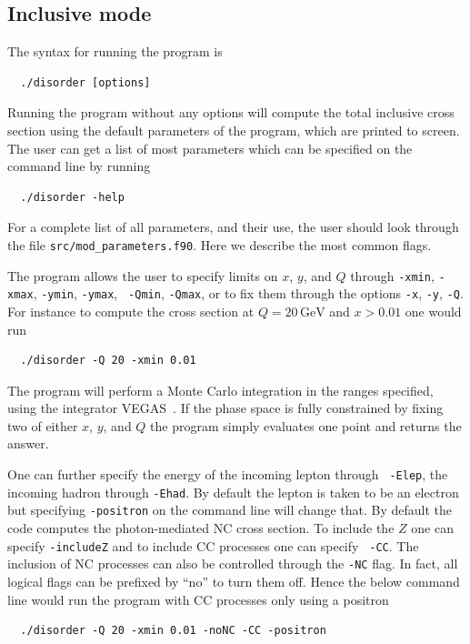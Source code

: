 \documentclass[submission, PhysCodeb]{SciPost}
\newcommand{\GEV}{\,\mathrm{GeV}}
\begin{document}
\subsection{Inclusive mode}
\label{sec:Inclusive}
The syntax for running the program is
\begin{lstlisting}
  ./disorder [options]
\end{lstlisting}
Running the program without any options will compute the total
inclusive cross section using the default parameters of the
program, which are printed to screen. The user can get a list of most
parameters which can be specified on the command line by running
\begin{lstlisting}
  ./disorder -help
\end{lstlisting}
For a complete list of all parameters, and their use, the user should
look through the file {\tt src/mod\_parameters.f90}. Here we describe
the most common flags.

The program allows the user to specify limits on $x$, $y$, and $Q$
through {\tt -xmin}, {\tt -xmax}, {\tt -ymin}, {\tt -ymax}, {\tt
  -Qmin}, {\tt -Qmax}, or to fix them through the options {\tt -x},
{\tt -y}, {\tt -Q}. For instance to compute the cross section at $Q=20
\GEV$ and $x>0.01$ one would run
\begin{lstlisting}
  ./disorder -Q 20 -xmin 0.01
\end{lstlisting}
The program will perform a Monte Carlo integration in the ranges
specified, using the integrator VEGAS~\cite{Lepage:1977sw}. If the
phase space is fully constrained by fixing two of either $x$, $y$, and
$Q$ the program simply evaluates one point and returns the answer.

One can further specify the energy of the incoming lepton through {\tt
  -Elep}, the incoming hadron through {\tt -Ehad}. By default the
lepton is taken to be an electron but specifying {\tt -positron} on
the command line will change that. By default the code computes the
photon-mediated NC cross section. To include the $Z$ one can specify
{\tt -includeZ} and to include CC processes one can specify {\tt
  -CC}. The inclusion of NC processes can also be controlled through
the {\tt -NC} flag. In fact, all logical flags can be prefixed by
``no'' to turn them off. Hence the below command line would run the
program with CC processes only using a positron
\begin{lstlisting}
  ./disorder -Q 20 -xmin 0.01 -noNC -CC -positron
\end{lstlisting}
\end{document}

